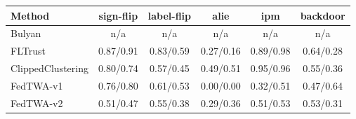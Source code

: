\begin{tabular}{lccccc}
\toprule
Method & sign-flip & label-flip & alie & ipm & backdoor\\
\midrule
Bulyan & n/a & n/a & n/a & n/a & n/a\\
FLTrust & 0.87/0.91 & 0.83/0.59 & 0.27/0.16 & 0.89/0.98 & 0.64/0.28\\
ClippedClustering & 0.80/0.74 & 0.57/0.45 & 0.49/0.51 & 0.95/0.96 & 0.55/0.36\\
FedTWA-v1 & 0.76/0.80 & 0.61/0.53 & 0.00/0.00 & 0.32/0.51 & 0.47/0.64\\
FedTWA-v2 & 0.51/0.47 & 0.55/0.38 & 0.29/0.36 & 0.51/0.53 & 0.53/0.31\\
\bottomrule
\end{tabular}
